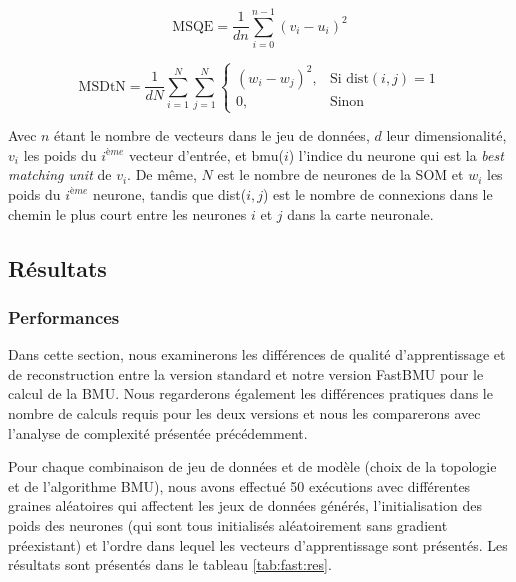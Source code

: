 	\begin{equation}
		\text{MSQE} = \frac{1}{dn} \sum_{i=0}^{n-1} (v_i - u_i)^2
	\end{equation}

	\begin{equation}
    	\text{MSDtN} = \frac{1}{dN} \sum_{i=1}^{N} \sum_{j=1}^{N} 
    	\begin{cases}
        	(w_i - w_j)^2,  & \text{Si dist}(i, j) = 1\\
        	0,              & \text{Sinon}
    	\end{cases}
	\end{equation}

	Avec $n$ étant le nombre de vecteurs dans le jeu de données, $d$ leur dimensionalité, $v_i$ les poids du $i^{ème}$ vecteur d'entrée, et bmu($i$) l'indice du neurone qui est la \textit{best matching unit} de $v_i$. De même, $N$ est le nombre de neurones de la SOM et $w_i$ les poids du $i^{ème}$ neurone, tandis que dist($i, j$) est le nombre de connexions dans le chemin le plus court entre les neurones $i$ et $j$ dans la carte neuronale.

	\subsection{Résultats}
	\subsubsection{Performances}

	Dans cette section, nous examinerons les différences de qualité d'apprentissage et de reconstruction entre la version standard et notre version FastBMU pour le calcul de la BMU. Nous regarderons également les différences pratiques dans le nombre de calculs requis pour les deux versions et nous les comparerons avec l'analyse de complexité présentée précédemment.

	Pour chaque combinaison de jeu de données et de modèle (choix de la topologie et de l'algorithme BMU), nous avons effectué 50 exécutions avec différentes graines aléatoires qui affectent les jeux de données générés, l'initialisation des poids des neurones (qui sont tous initialisés aléatoirement sans gradient préexistant) et l'ordre dans lequel les vecteurs d'apprentissage sont présentés. Les résultats sont présentés dans le tableau \ref{tab:fast:res}.

